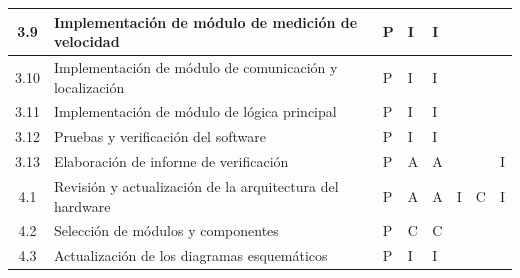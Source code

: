 \documentclass[11pt]{charter}
\begin{document}
\begin{table}[!htpb]
{\begin{tabular}{|c|m{3.5cm}|m{2cm}|m{2cm}|m{2cm}|m{2cm}|m{2cm}|m{2cm}|}
    3.9 & Implementación de módulo de medición de velocidad & P & I & I & & & \\ \hline
    3.10 & Implementación de módulo de comunicación y localización & P & I & I & & & \\ \hline
    3.11 & Implementación de módulo de lógica principal & P & I & I & & & \\ \hline
    3.12 & Pruebas y verificación del software & P & I & I & & & \\ \hline
    3.13 & Elaboración de informe de verificación & P & A & A & & & I \\ \hline
    4.1 & Revisión y actualización de la arquitectura del hardware & P & A & A & I & C & I \\ \hline
    4.2 & Selección de módulos y componentes & P & C & C & & & \\ \hline
    4.3 & Actualización de los diagramas esquemáticos & P & I & I & & & \\  \hline
  \end{tabular}
  }%
\end{table}
\end{document}

